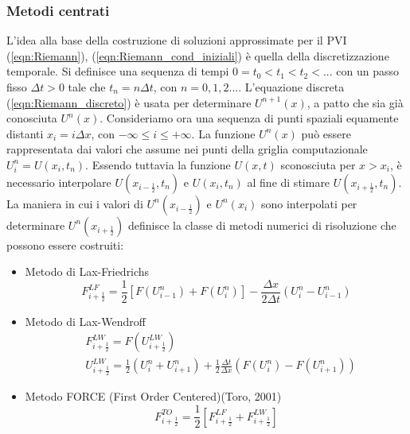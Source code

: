 \documentclass[12pt]{article} %
\begin{document}
\subsubsection{Metodi centrati}
\noindent L'idea alla base della costruzione di soluzioni approssimate per il PVI (\ref{eqn:Riemann}), (\ref{eqn:Riemann_cond_iniziali}) è quella della discretizzazione temporale. Si definisce una sequenza di tempi $0=t_0<t_1<t_2<...$ con un passo fisso $\Delta t>0$ tale che $t_n=n\Delta t$, con $n=0,1,2...$. L'equazione discreta (\ref{eqn:Riemann_discreto}) è usata per determinare  $U^{n+1}(x)$, a patto che sia già conosciuta  $U^{n}(x)$. Consideriamo ora una sequenza di punti spaziali equamente distanti $x_i=i\Delta x$, con $-\infty\leq i \leq+\infty$. La funzione $U^{n}(x)$ può essere rappresentata dai valori che assume nei punti della griglia computazionale $U_i^{n}=U(x_i,t_n)$. Essendo tuttavia la funzione $U(x,t)$ sconosciuta per $x > x_i$, è necessario interpolare $U\left(x_{i-\frac{1}{2}},t_n\right)$ e $U(x_i,t_n)$ al fine di stimare $U\left(x_{i+\frac{1}{2}},t_n\right)$. La maniera in cui i valori di $U^n\left(x_{i-\frac{1}{2}}\right)$ e $U^n(x_i)$ sono interpolati per determinare $U^n\left(x_{i+\frac{1}{2}}\right)$ definisce la classe di metodi numerici di risoluzione che possono essere costruiti:
\begin{itemize}
    \item Metodo di Lax-Friedrichs
    \begin{equation}
        F_{i+\frac{1}{2}}^{LF}=\frac{1}{2}\left[F(U_{i-1}^n)+F(U_i^n)\right]-\frac{\Delta x}{2\Delta t}(U_i^n-U_{i-1}^n)
        \label{eqn:Lax-Friedrichs}
    \end{equation}
    \item Metodo di Lax-Wendroff
        \begin{equation}
        \begin{split}
           &F_{i+\frac{1}{2}}^{LW}=F(U_{i+\frac{1}{2}}^{LW}) \\
           &U_{i+\frac{1}{2}}^{LW}=\frac{1}{2}\left(U_i^n+U_{i+1}^n\right)+\frac{1}{2}\frac{\Delta t}{\Delta x}\left(F(U_i^n)-F(U_{i+1}^n)\right)
        \end{split}
        \label{eqn:Lax-Wendroff}
    \end{equation}
    \item Metodo FORCE (First Order Centered)(Toro, 2001)
    \begin{equation}
        F_{i+\frac{1}{2}}^{TO}=\frac{1}{2}\left[F_{i+\frac{1}{2}}^{LF}+F_{i+\frac{1}{2}}^{LW}\right]
        \label{eqn:FORCE}
        \end{equation}
\end{itemize}
\end{document}
